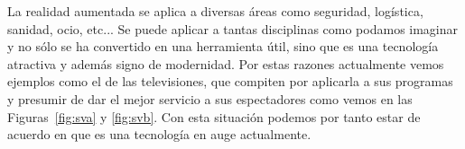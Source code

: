 \begin{figure}[htb]
    \centering
\end{figure}


La realidad aumentada se aplica a diversas áreas como seguridad, logística, sanidad, ocio, etc...
 Se puede aplicar a tantas disciplinas como podamos imaginar y no sólo se ha convertido en una herramienta útil, sino que es una tecnología atractiva
 y además signo de modernidad. Por estas razones actualmente vemos ejemplos como el de las televisiones, que compiten por aplicarla a sus programas
 y presumir de dar el mejor servicio a sus espectadores como vemos en las Figuras~\ref{fig:sva} y \ref{fig:svb}. Con esta situación podemos por tanto estar de acuerdo
 en que es una tecnología en auge actualmente. 



